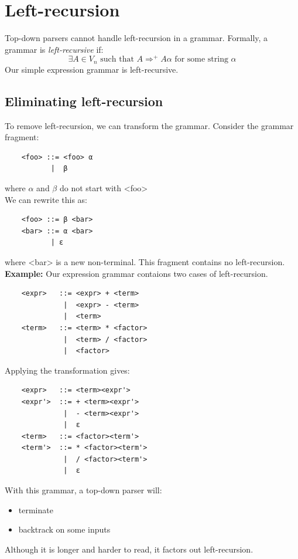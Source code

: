 \documentclass[10pt]{article}
\begin{document}
\section*{Left-recursion}
Top-down parsers cannot handle left-recursion in a grammar.  Formally, a grammar is \textit{left-recursive} if:
\[\exists A \in V_n \text{ such that } A \Rightarrow^+ A\alpha \text{ for some string } \alpha\]
Our simple expression grammar is left-recursive.
\subsection*{Eliminating left-recursion}
To remove left-recursion, we can transform the grammar.  Consider the grammar fragment:
\begin{verbatim}
    <foo> ::= <foo> α
           |  β
\end{verbatim}
where $\alpha$ and $\beta$ do not start with <foo>\\
We can rewrite this as:
\begin{verbatim}
    <foo> ::= β <bar>
    <bar> ::= α <bar>
           | ε
\end{verbatim}
where <bar> is a new non-terminal.  This fragment contains no left-recursion.\\
\textbf{Example:} Our expression grammar contaions two cases of left-recursion.
\begin{verbatim}
    <expr>   ::= <expr> + <term>
              |  <expr> - <term>
              |  <term>
    <term>   ::= <term> * <factor>
              |  <term> / <factor>
              |  <factor>
\end{verbatim}
Applying the transformation gives:
\begin{verbatim}
    <expr>   ::= <term><expr'>
    <expr'>  ::= + <term><expr'>
              |  - <term><expr'>
              |  ε
    <term>   ::= <factor><term'>
    <term'>  ::= * <factor><term'>
              |  / <factor><term'>
              |  ε
\end{verbatim}
With this grammar, a top-down parser will:
\begin{itemize}
    \item terminate
    \item backtrack on some inputs
\end{itemize}
Although it is longer and harder to read, it factors out left-recursion.
\end{document}
